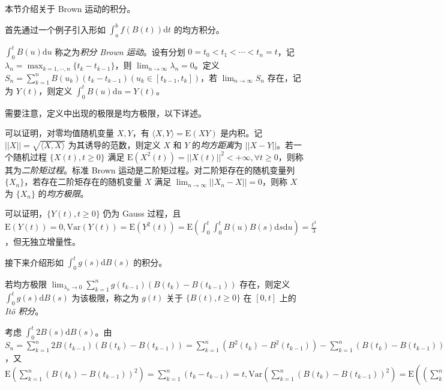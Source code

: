 \documentclass[../main.tex]{subfiles}
\begin{document}
本节介绍关于 Brown 运动的积分。

首先通过一个例子引入形如 $\int_a^bf(B(t))\mathrm dt$ 的均方积分。

\begin{example}
    $\int_0^tB(u)\mathrm du$ 称之为\emph{积分 Brown 运动}。设有分划 $0=t_0<t_1<\cdots<t_n=t$，记 $\lambda_n=\max_{k=1,\cdots,n}\{t_k-t_{k-1}\}$，则 $\lim_{n\rightarrow\infty}\lambda_n=0$。定义 $S_n=\sum_{k=1}^nB(u_k)(t_k-t_{k-1})(u_k\in[t_{k-1},t_k])$，若 $\lim_{n\rightarrow\infty}S_n$ 存在，记为 $Y(t)$，则定义 $\int_0^tB(u)\mathrm du=Y(t)$。
\end{example}

需要注意，定义中出现的极限是均方极限，以下详述。

\begin{definition}\label{def:8.5.1}
    可以证明，对零均值随机变量 $X,Y$，有 $\langle X,Y\rangle=\mathrm E(XY)$ 是内积。记 $||X||=\sqrt{\langle X,X\rangle}$ 为其诱导的范数，则定义 $X$ 和 $Y$ 的\emph{均方距离}为 $||X-Y||$。若一个随机过程 $\{X(t),t\geq0\}$ 满足 $\mathrm E(X^2(t))=||X(t)||^2<+\infty,\forall t\geq0$，则称其为\emph{二阶矩过程}。标准 Brown 运动是二阶矩过程。对二阶矩存在的随机变量列 $\{X_n\}$，若存在二阶矩存在的随机变量 $X$ 满足 $\lim_{n\rightarrow\infty}||X_n-X||=0$，则称 $X$ 为 $\{X_n\}$ 的\emph{均方极限}。
\end{definition}

可以证明，$\{Y(t),t\geq0\}$ 仍为 Gauss 过程，且 $\mathrm E(Y(t))=0,\mathrm{Var}(Y(t))=\mathrm E(Y^2(t))=\mathrm E(\int_0^t\int_0^tB(u)B(s)\mathrm ds\mathrm du)=\frac{t^3}3$，但无独立增量性。

接下来介绍形如 $\int_0^tg(s)\mathrm dB(s)$ 的积分。

\begin{definition}\label{def:8.5.2}
    若均方极限 $\lim_{\lambda_n\rightarrow0}\sum_{k=1}^ng(t_{k-1})(B(t_k)-B(t_{k-1}))$ 存在，则定义 $\int_0^tg(s)\mathrm dB(s)$ 为该极限，称之为 $g(t)$ 关于 $\{B(t),t\geq0\}$ 在 $[0,t]$ 上的 \emph{It\"o 积分}。
\end{definition}

\begin{example}
    考虑 $\int_0^t2B(s)\mathrm dB(s)$。由 $S_n=\sum_{k=1}^n2B(t_{k-1})(B(t_k)-B(t_{k-1}))=\sum_{k=1}^n(B^2(t_k)-B^2(t_{k-1}))-\sum_{k=1}^n(B(t_k)-B(t_{k-1}))^2=B^2(t)-B^2(0)-\sum_{k=1}^n(B(t_k)-B(t_{k-1}))^2$，又 $\mathrm E(\sum_{k=1}^n(B(t_k)-B(t_{k-1}))^2)=\sum_{k=1}^n(t_k-t_{k-1})=t,
        \mathrm{Var}(\sum_{k=1}^n(B(t_k)-B(t_{k-1}))^2)
        =\mathrm E((\sum_{k=1}^n(B(t_k)-B(t_{k-1}))^2-t)^2)
        =\mathrm E((\sum_{k=1}^n((B(t_k)-B(t_{k-1}))^2-(t_k-t_{k-1})))^2)
        =\mathrm E(\sum_{k=1}^n((B(t_k)-B(t_{k-1})^2-(t_k-t_{k-1}))^2))+\sum_{i\neq j}\mathrm E((B(t_i)-B(t_{i-1}))^2-(t_i-t_{i-1}))\mathrm E((B(t_j)-B(t_{j-1}))^2-(t_j-t_{j-1}))$
\end{example}
\end{document}
